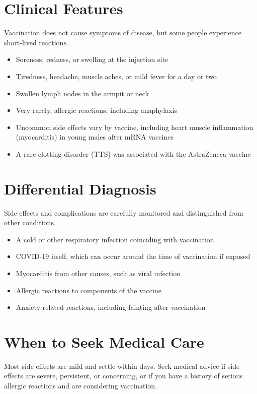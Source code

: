 \section*{Clinical Features}
Vaccination does not cause symptoms of disease, but some people experience short-lived reactions.

\begin{itemize}
    \item Soreness, redness, or swelling at the injection site
    \item Tiredness, headache, muscle aches, or mild fever for a day or two
    \item Swollen lymph nodes in the armpit or neck
    \item Very rarely, allergic reactions, including anaphylaxis
    \item Uncommon side effects vary by vaccine, including heart muscle inflammation (myocarditis) in young males after mRNA vaccines
    \item A rare clotting disorder (TTS) was associated with the AstraZeneca vaccine
\end{itemize}

\section*{Differential Diagnosis}
Side effects and complications are carefully monitored and distinguished from other conditions.

\begin{itemize}
    \item A cold or other respiratory infection coinciding with vaccination
    \item COVID-19 itself, which can occur around the time of vaccination if exposed
    \item Myocarditis from other causes, such as viral infection
    \item Allergic reactions to components of the vaccine
    \item Anxiety-related reactions, including fainting after vaccination
\end{itemize}

\section*{When to Seek Medical Care}
Most side effects are mild and settle within days. Seek medical advice if side effects are severe, persistent, or concerning, or if you have a history of serious allergic reactions and are considering vaccination.

